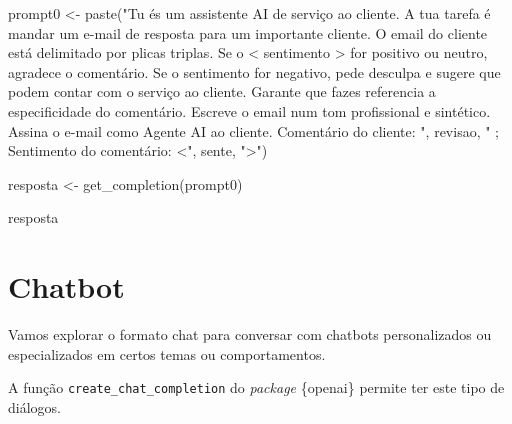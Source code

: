 \documentclass[
  letterpaper,
  paper=6in:9in,
  pagesize=pdftex,
  headinclude=on,
  footinclude=on,
  12pt]{scrbook}
\newenvironment{Shaded}{\begin{snugshade}}{\end{snugshade}}
\newcommand{\FunctionTok}[1]{\textcolor[rgb]{0.28,0.35,0.67}{#1}}
\newcommand{\NormalTok}[1]{\textcolor[rgb]{0.00,0.23,0.31}{#1}}
\newcommand{\OtherTok}[1]{\textcolor[rgb]{0.00,0.23,0.31}{#1}}
\newcommand{\StringTok}[1]{\textcolor[rgb]{0.13,0.47,0.30}{#1}}
\begin{document}
\begin{Shaded}
\begin{Highlighting}[]
\NormalTok{prompt0 }\OtherTok{\textless{}{-}} \FunctionTok{paste}\NormalTok{(}\StringTok{"Tu és um assistente AI de serviço ao cliente. A tua tarefa é mandar um e{-}mail de resposta}
\StringTok{                 para um importante cliente. O email do cliente está delimitado por plicas triplas.}
\StringTok{                 Se o \textless{} sentimento \textgreater{} for positivo ou neutro, agradece o comentário. Se o sentimento for negativo,}
\StringTok{                 pede desculpa e sugere que podem contar com o serviço ao cliente.}
\StringTok{                 Garante que fazes referencia a especificidade do comentário. }
\StringTok{                 Escreve o email num tom profissional e sintético.}
\StringTok{                 Assina o e{-}mail como \textasciigrave{}Agente AI ao cliente\textasciigrave{}. Comentário do cliente: \textquotesingle{}\textquotesingle{}\textquotesingle{}"}\NormalTok{,}
\NormalTok{                 revisao, }\StringTok{" \textquotesingle{}\textquotesingle{}\textquotesingle{}; Sentimento do comentário: \textless{}"}\NormalTok{, sente, }\StringTok{"\textgreater{}"}\NormalTok{)}

\NormalTok{resposta }\OtherTok{\textless{}{-}} \FunctionTok{get\_completion}\NormalTok{(prompt0)}

\NormalTok{resposta}
\end{Highlighting}
\end{Shaded}


\hypertarget{chatbot}{%
\chapter{Chatbot}\label{chatbot}}

Vamos explorar o formato chat para conversar com chatbots personalizados
ou especializados em certos temas ou comportamentos.

A função \texttt{create\_chat\_completion} do \emph{package} \{openai\}
permite ter este tipo de diálogos.
\end{document}
